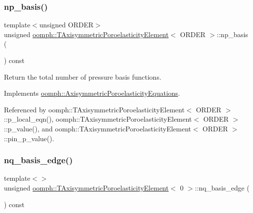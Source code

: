 \subsubsection{\texorpdfstring{np\+\_\+basis()}{np\_basis()}\hspace{0.1cm}{\footnotesize\ttfamily [3/3]}}
{\footnotesize\ttfamily template$<$unsigned O\+R\+D\+ER$>$ \\
unsigned \hyperlink{classoomph_1_1TAxisymmetricPoroelasticityElement}{oomph\+::\+T\+Axisymmetric\+Poroelasticity\+Element}$<$ O\+R\+D\+ER $>$\+::np\+\_\+basis (\begin{DoxyParamCaption}{ }\end{DoxyParamCaption}) const\hspace{0.3cm}{\ttfamily [virtual]}}



Return the total number of pressure basis functions. 



Implements \hyperlink{classoomph_1_1AxisymmetricPoroelasticityEquations_a8a17486deaa1115a98608e76344aa67c}{oomph\+::\+Axisymmetric\+Poroelasticity\+Equations}.



Referenced by oomph\+::\+T\+Axisymmetric\+Poroelasticity\+Element$<$ O\+R\+D\+E\+R $>$\+::p\+\_\+local\+\_\+eqn(), oomph\+::\+T\+Axisymmetric\+Poroelasticity\+Element$<$ O\+R\+D\+E\+R $>$\+::p\+\_\+value(), and oomph\+::\+T\+Axisymmetric\+Poroelasticity\+Element$<$ O\+R\+D\+E\+R $>$\+::pin\+\_\+p\+\_\+value().

\mbox{\label{classoomph_1_1TAxisymmetricPoroelasticityElement_adcb6279faff778530b9fb118f56636e4}} 
\subsubsection{\texorpdfstring{nq\+\_\+basis\+\_\+edge()}{nq\_basis\_edge()}\hspace{0.1cm}{\footnotesize\ttfamily [1/3]}}
{\footnotesize\ttfamily template$<$$>$ \\
unsigned \hyperlink{classoomph_1_1TAxisymmetricPoroelasticityElement}{oomph\+::\+T\+Axisymmetric\+Poroelasticity\+Element}$<$ 0 $>$\+::nq\+\_\+basis\+\_\+edge (\begin{DoxyParamCaption}{ }\end{DoxyParamCaption}) const\hspace{0.3cm}{\ttfamily [virtual]}}



